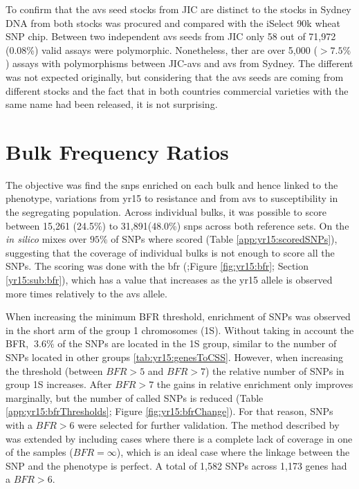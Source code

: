To confirm that the \acrlong{avs} seed stocks from JIC are distinct to the stocks in Sydney  DNA from both stocks was procured and compared with the iSelect 90k wheat SNP chip. 
Between two independent \acrlong{avs} seeds from JIC only 58 out of 71,972 (0.08\%) valid assays were polymorphic. 
Nonetheless, ther are over 5,000 ($>7.5\%$) assays with polymorphisms between  JIC-\acrlong{avs} and \acrlong{avs} from Sydney. 
The different was not expected originally, but considering that the \acrlong{avs} seeds are coming from different stocks and the fact that in both countries commercial varieties with the same name had been released, it is not surprising. 


\section{Bulk Frequency Ratios}
\label{sec:yr15:bfr}



The objective was find the \acrshort{snp}s enriched on each bulk and hence linked to the phenotype, variations from \acrshort{yr15} to resistance and from \acrshort{avs} to susceptibility in the segregating population. 
Across individual bulks, it was possible to score between 15,261 (24.5\%) to 31,891(48.0\%) \acrshort{snp}s across both reference sets.
On the \textit{in silico} mixes over $95\%$ of SNPs where scored (Table \ref{app:yr15:scoredSNPs}), suggesting that the coverage of individual bulks is not enough to score all the SNPs.  
The scoring was done with the \acrlong{bfr} (\citealt{Trick2012};Figure \ref{fig:yr15:bfr}; Section \ref{yr15:sub:bfr}), which has a value that increases as the \acrshort{yr15} allele is observed more times relatively to the \acrshort{avs} allele.



When increasing the minimum BFR threshold, enrichment of SNPs was observed in the short arm of the group 1 chromosomes (1S). 
Without taking in account the BFR, $~3.6\%$ of the SNPs are located in the 1S group, similar to the number of SNPs located in other groups \ref{tab:yr15:genesToCSS}. 
However, when increasing the threshold  (between $BFR > 5 $ and $BFR > 7$) the relative number of SNPs in group 1S increases. 
After $BFR>7$ the gains in relative enrichment only improves marginally, but the number of called SNPs is reduced (Table \ref{app:yr15:bfrThresholds}; Figure \ref{fig:yr15:bfrChange}).
For that reason, SNPs with a $BFR>6$ were selected for further validation. 
The method described by \citet{Trick2012} was extended by including cases where there is a complete lack of coverage in one of the samples ($BFR=\infty$), which is an ideal case where the linkage between the SNP and the phenotype is perfect. 
A total of 1,582 SNPs across 1,173 genes had a $BFR>6$.



